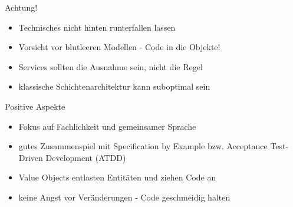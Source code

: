 \begin{frame}{}
\end{frame}


\begin{frame}{Achtung!}
\begin{itemize}
\item Technisches nicht hinten runterfallen lassen
\item Vorsicht vor blutleeren Modellen - Code in die Objekte!
\item Services sollten die Ausnahme sein, nicht die Regel
\item klassische Schichtenarchitektur kann suboptimal sein
\end{itemize}
\end{frame}


\begin{frame}{Positive Aspekte}
\begin{itemize}
\item Fokus auf Fachlichkeit und gemeinsamer Sprache
\item gutes Zusammenspiel mit Specification by Example bzw. Acceptance Test-Driven Development (ATDD)
\item Value Objects entlasten Entitäten und ziehen Code an
\item keine Angst vor Veränderungen - Code geschmeidig halten
\end{itemize}
\end{frame}



%


